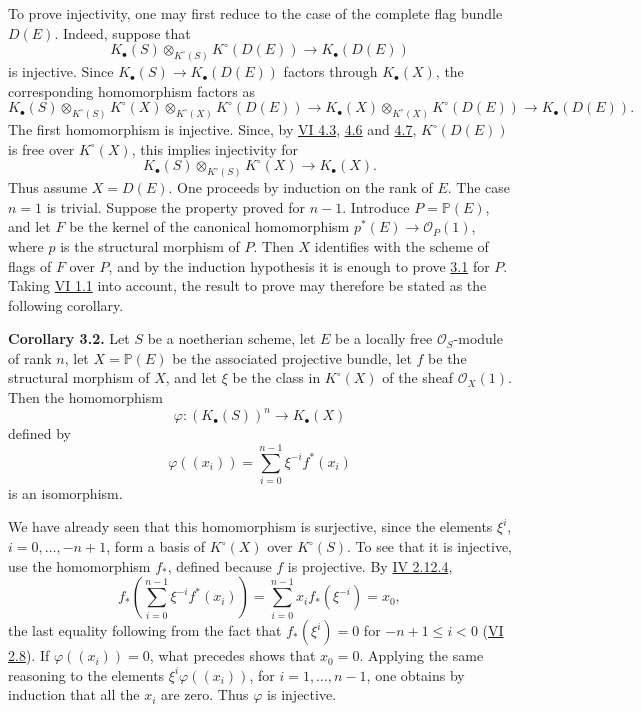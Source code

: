 To prove injectivity, one may first reduce to the case of the complete flag bundle $D(E)$. Indeed, suppose that
\[
 K_\bullet(S)\otimes_{K^\circ(S)}K^\circ(D(E))\longrightarrow K_\bullet(D(E))
\]
is injective. Since $K_\bullet(S)\to K_\bullet(D(E))$ factors through $K_\bullet(X)$, the corresponding homomorphism factors as
\[
 K_\bullet(S)\otimes_{K^\circ(S)}K^\circ(X)\otimes_{K^\circ(X)}K^\circ(D(E))
 \longrightarrow
 K_\bullet(X)\otimes_{K^\circ(X)}K^\circ(D(E))
 \longrightarrow K_\bullet(D(E)).
\]
The first homomorphism is injective. Since, by \hyperlink{sga6.e06.lem.4-3}{VI 4.3}, \hyperlink{sga6.e06.thm.4-6}{4.6} and \hyperlink{sga6.e06.cor.4-7}{4.7}, $K^\circ(D(E))$ is free over $K^\circ(X)$, this implies injectivity for
\[
 K_\bullet(S)\otimes_{K^\circ(S)}K^\circ(X)\to K_\bullet(X).
\]
Thus assume $X=D(E)$. One proceeds by induction on the rank of $E$. The case $n=1$ is trivial. Suppose the property proved for $n-1$. Introduce $P=\mathbb P(E)$, and let $F$ be the kernel of the canonical homomorphism $p^*(E)\to\mathcal O_P(1)$, where $p$ is the structural morphism of $P$. Then $X$ identifies with the scheme of flags of $F$ over $P$, and by the induction hypothesis it is enough to prove \hyperlink{sga6.e09.prop.3-1}{3.1} for $P$. Taking \hyperlink{sga6.e06.thm.1-1}{VI 1.1} into account, the result to prove may therefore be stated as the following corollary.

\textbf{Corollary 3.2.} Let $S$ be a noetherian scheme, let $E$ be a locally free $\mathcal O_S$-module of rank $n$, let $X=\mathbb P(E)$ be the associated projective bundle, let $f$ be the structural morphism of $X$, and let $\xi$ be the class in $K^\circ(X)$ of the sheaf $\mathcal O_X(1)$. Then the homomorphism
\[
 \varphi:(K_\bullet(S))^n\longrightarrow K_\bullet(X)
\]
defined by
\[
 \varphi((x_i))=\sum_{i=0}^{n-1}\xi^{-i}f^*(x_i)
\]
is an isomorphism.

We have already seen that this homomorphism is surjective, since the elements $\xi^i$, $i=0,\ldots,-n+1$, form a basis of $K^\circ(X)$ over $K^\circ(S)$. To see that it is injective, use the homomorphism $f_*$, defined because $f$ is projective. By \hyperlink{sga6.e04.eq.2-12-4}{IV 2.12.4},
\[
 f_*\left(\sum_{i=0}^{n-1}\xi^{-i}f^*(x_i)\right)
 =\sum_{i=0}^{n-1}x_i f_*(\xi^{-i})=x_0,
\]
the last equality following from the fact that $f_*(\xi^i)=0$ for $-n+1\leq i<0$ (\hyperlink{sga6.e06.sec.2.8}{VI 2.8}). If $\varphi((x_i))=0$, what precedes shows that $x_0=0$. Applying the same reasoning to the elements $\xi^i\varphi((x_i))$, for $i=1,\ldots,n-1$, one obtains by induction that all the $x_i$ are zero. Thus $\varphi$ is injective.

